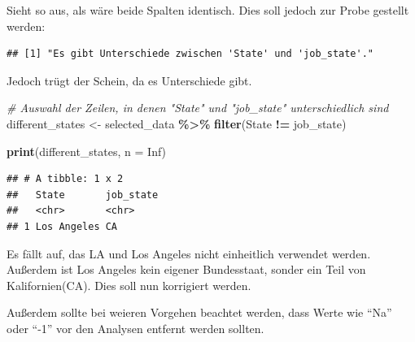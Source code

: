 \documentclass[
]{article}
\newenvironment{Shaded}{\begin{snugshade}}{\end{snugshade}}
\newcommand{\AttributeTok}[1]{\textcolor[rgb]{0.13,0.29,0.53}{#1}}
\newcommand{\CommentTok}[1]{\textcolor[rgb]{0.56,0.35,0.01}{\textit{#1}}}
\newcommand{\ConstantTok}[1]{\textcolor[rgb]{0.56,0.35,0.01}{#1}}
\newcommand{\ControlFlowTok}[1]{\textcolor[rgb]{0.13,0.29,0.53}{\textbf{#1}}}
\newcommand{\FunctionTok}[1]{\textcolor[rgb]{0.13,0.29,0.53}{\textbf{#1}}}
\newcommand{\NormalTok}[1]{#1}
\newcommand{\OtherTok}[1]{\textcolor[rgb]{0.56,0.35,0.01}{#1}}
\newcommand{\SpecialCharTok}[1]{\textcolor[rgb]{0.81,0.36,0.00}{\textbf{#1}}}
\newcommand{\StringTok}[1]{\textcolor[rgb]{0.31,0.60,0.02}{#1}}
\begin{document}
Sieht so aus, als wäre beide Spalten identisch. Dies soll jedoch zur
Probe gestellt werden:

\begin{Shaded}
\end{Shaded}

\begin{verbatim}
## [1] "Es gibt Unterschiede zwischen 'State' und 'job_state'."
\end{verbatim}

Jedoch trügt der Schein, da es Unterschiede gibt.

\begin{Shaded}
\begin{Highlighting}[]
\CommentTok{\# Auswahl der Zeilen, in denen "State" und "job\_state" unterschiedlich sind}
\NormalTok{different\_states }\OtherTok{\textless{}{-}}\NormalTok{ selected\_data }\SpecialCharTok{\%\textgreater{}\%}
  \FunctionTok{filter}\NormalTok{(State }\SpecialCharTok{!=}\NormalTok{ job\_state)}

\FunctionTok{print}\NormalTok{(different\_states, }\AttributeTok{n =} \ConstantTok{Inf}\NormalTok{)}
\end{Highlighting}
\end{Shaded}

\begin{verbatim}
## # A tibble: 1 x 2
##   State       job_state
##   <chr>       <chr>    
## 1 Los Angeles CA
\end{verbatim}

Es fällt auf, das LA und Los Angeles nicht einheitlich verwendet werden.
Außerdem ist Los Angeles kein eigener Bundesstaat, sonder ein Teil von
Kalifornien(CA). Dies soll nun korrigiert werden.

Außerdem sollte bei weieren Vorgehen beachtet werden, dass Werte wie
``Na'' oder ``-1'' vor den Analysen entfernt werden sollten.
\end{document}
